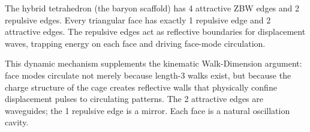 \documentclass[11pt,letterpaper]{article}
\begin{document}
The hybrid tetrahedron (the baryon scaffold) has 4 attractive ZBW
edges and 2 repulsive edges.  Every triangular face has exactly
1 repulsive edge and 2 attractive edges.  The repulsive edges act
as reflective boundaries for displacement waves, trapping energy
on each face and driving face-mode circulation.

This dynamic mechanism supplements the kinematic Walk-Dimension
argument: face modes circulate not merely because length-3 walks
exist, but because the charge structure of the cage creates
reflective walls that physically confine displacement pulses to
circulating patterns.  The 2 attractive edges are waveguides; the
1 repulsive edge is a mirror.  Each face is a natural oscillation
cavity.



\end{document}
